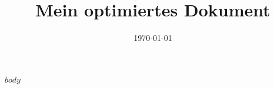 \documentclass[12pt,a4paper]{scrartcl}
\title{Mein optimiertes Dokument}
\date{\today}
\begin{document}
\maketitle

$body$  %
\end{document}
